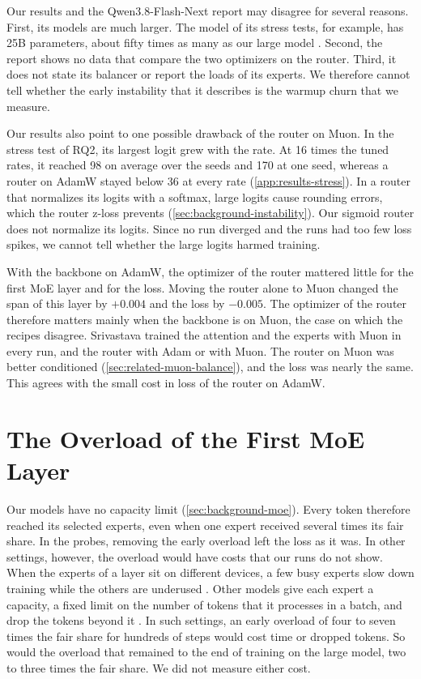 Our results and the Qwen3.8-Flash-Next report may disagree for several reasons. First, its models are much larger. The model of its stress tests, for example, has 25B parameters, about fifty times as many as our large model \cite{qiu2026qwennext}. Second, the report shows no data that compare the two optimizers on the router. Third, it does not state its balancer or report the loads of its experts. We therefore cannot tell whether the early instability that it describes is the warmup churn that we measure.

Our results also point to one possible drawback of the router on Muon. In the stress test of RQ2, its largest logit grew with the rate. At 16 times the tuned rates, it reached 98 on average over the seeds and 170 at one seed, whereas a router on AdamW stayed below 36 at every rate (\cref{app:results-stress}). In a router that normalizes its logits with a softmax, large logits cause rounding errors, which the router z-loss prevents (\cref{sec:background-instability}). Our sigmoid router does not normalize its logits. Since no run diverged and the runs had too few loss spikes, we cannot tell whether the large logits harmed training.

With the backbone on AdamW, the optimizer of the router mattered little for the first MoE layer and for the loss. Moving the router alone to Muon changed the span of this layer by $+0.004$ and the loss by $-0.005$. The optimizer of the router therefore matters mainly when the backbone is on Muon, the case on which the recipes disagree. Srivastava \cite{srivastava2026lossfree} trained the attention and the experts with Muon in every run, and the router with Adam or with Muon. The router on Muon was better conditioned (\cref{sec:related-muon-balance}), and the loss was nearly the same. This agrees with the small cost in loss of the router on AdamW.

\section{The Overload of the First MoE Layer}
\label{sec:discussion-overload}
Our models have no capacity limit (\cref{sec:background-moe}). Every token therefore reached its selected experts, even when one expert received several times its fair share. In the probes, removing the early overload left the loss as it was. In other settings, however, the overload would have costs that our runs do not show. When the experts of a layer sit on different devices, a few busy experts slow down training while the others are underused \cite{lepikhin2021gshard}. Other models give each expert a capacity, a fixed limit on the number of tokens that it processes in a batch, and drop the tokens beyond it \cite{fedus2022switch}. In such settings, an early overload of four to seven times the fair share for hundreds of steps would cost time or dropped tokens. So would the overload that remained to the end of training on the large model, two to three times the fair share. We did not measure either cost.

